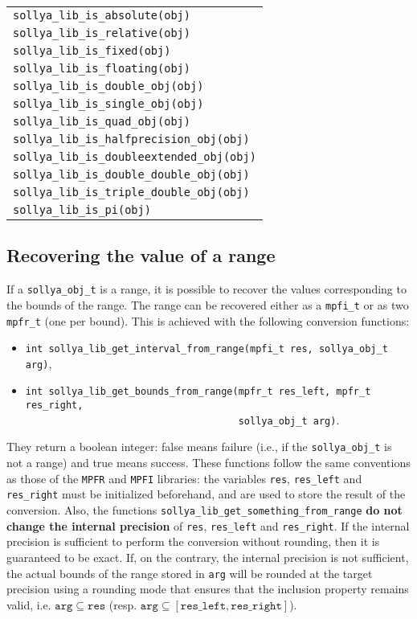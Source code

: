 \documentclass[a4paper]{article}
\begin{document}
\begin{table}[htp]
\begin{center}
\begin{tabular}{|l|}
      \verb|sollya_lib_is_absolute(obj)| \\
      \verb|sollya_lib_is_relative(obj)| \\
      \verb|sollya_lib_is_fixed(obj)| \\
      \verb|sollya_lib_is_floating(obj)| \\
      \verb|sollya_lib_is_double_obj(obj)| \\
      \verb|sollya_lib_is_single_obj(obj)| \\
      \verb|sollya_lib_is_quad_obj(obj)| \\
      \verb|sollya_lib_is_halfprecision_obj(obj)| \\
      \verb|sollya_lib_is_doubleextended_obj(obj)| \\
      \verb|sollya_lib_is_double_double_obj(obj)| \\
      \verb|sollya_lib_is_triple_double_obj(obj)| \\
      \verb|sollya_lib_is_pi(obj)| \\
      \hline
  \end{tabular}
\end{center}
\end{table}

\subsection{Recovering the value of a range}
If a \verb|sollya_obj_t| is a range, it is possible to recover the values corresponding to the bounds of the range. The range can be recovered either as a \verb|mpfi_t| or as two \verb|mpfr_t| (one per bound). This is achieved with the following conversion functions:
\begin{itemize}
\item \verb|int sollya_lib_get_interval_from_range(mpfi_t res, sollya_obj_t arg)|,
\item \verb|int sollya_lib_get_bounds_from_range(mpfr_t res_left, mpfr_t res_right,|\\
      \verb|                                     sollya_obj_t arg)|.
\end{itemize}
They return a boolean integer: false means failure (i.e., if the \verb|sollya_obj_t| is not a range) and true means success. These functions follow the same conventions as those of the \verb|MPFR| and \verb|MPFI| libraries: the variables \verb|res|, \verb|res_left| and \verb|res_right| must be initialized beforehand, and are used to store the result of the conversion. Also, the functions \verb|sollya_lib_get_something_from_range| \textbf{do not change the internal precision} of \verb|res|, \verb|res_left| and \verb|res_right|. If the internal precision is sufficient to perform the conversion without rounding, then it is guaranteed to be exact. If, on the contrary, the internal precision is not sufficient, the actual bounds of the range stored in \verb|arg| will be rounded at the target precision using a rounding mode that ensures that the inclusion property remains valid, i.e. $\mathtt{arg} \subseteq \mathtt{res}$ (resp. $\mathtt{arg} \subseteq [\mathtt{res\_left}, \mathtt{res\_right}]$).
\end{document}
